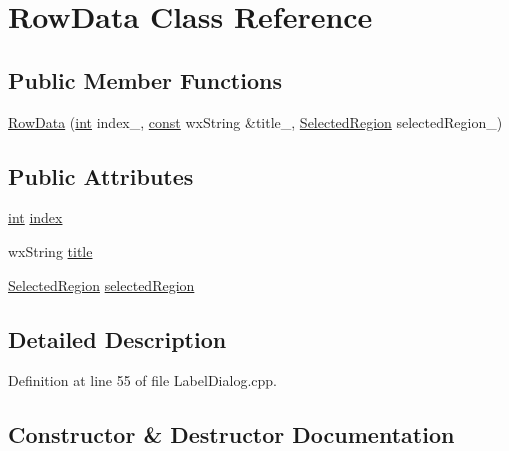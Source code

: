 \hypertarget{class_row_data}{}\section{Row\+Data Class Reference}
\label{class_row_data}
\subsection*{Public Member Functions}
\begin{DoxyCompactItemize}
\item 
\hyperlink{class_row_data_a70d1e467e130041d30536b402409c605}{Row\+Data} (\hyperlink{xmltok_8h_a5a0d4a5641ce434f1d23533f2b2e6653}{int} index\+\_\+, \hyperlink{getopt1_8c_a2c212835823e3c54a8ab6d95c652660e}{const} wx\+String \&title\+\_\+, \hyperlink{class_selected_region}{Selected\+Region} selected\+Region\+\_\+)
\end{DoxyCompactItemize}
\subsection*{Public Attributes}
\begin{DoxyCompactItemize}
\item 
\hyperlink{xmltok_8h_a5a0d4a5641ce434f1d23533f2b2e6653}{int} \hyperlink{class_row_data_a70f5f97b8d13c9dc90c064c5a9f8430c}{index}
\item 
wx\+String \hyperlink{class_row_data_ac0d1baa574a87217b87f57e1521e357b}{title}
\item 
\hyperlink{class_selected_region}{Selected\+Region} \hyperlink{class_row_data_a278149330b814bdf3889609a73e42ff5}{selected\+Region}
\end{DoxyCompactItemize}


\subsection{Detailed Description}


Definition at line 55 of file Label\+Dialog.\+cpp.



\subsection{Constructor \& Destructor Documentation}
